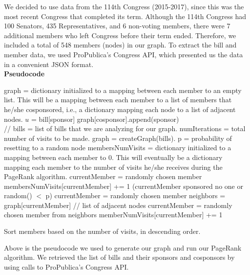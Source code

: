 \documentclass[11pt]{article}
\begin{document}
We decided to use data from the 114th Congress (2015-2017), since this was the most recent Congress that completed its term. Although the 114th Congress had 100 Senators, 435 Representatives, and 6 non-voting members, there were 7 additional members who left Congress before their term ended. Therefore, we included a total of 548 members (nodes) in our graph. To extract the bill and member data, we used ProPublica's Congress API, which presented us the data in a convenient JSON format. \\





\textbf{Pseudocode}

\begin{algorithmic}[1]
\State graph = dictionary initialized to a mapping between each member to an empty list. This will be a mapping between each member to a list of members that he/she cosponsored, i.e., a dictionary mapping each node to a list of adjacent nodes. 
	\State $u$ = bill[sponsor]
		\State graph[cosponsor].append(sponsor)
	\EndFor 
\EndFor
\EndProcedure\\


 // bills = list of bills that we are analyzing for our graph. numIterations = total number of visits to be made. 
\State graph = createGraph(bills). p = probability of resetting to a random node
\State membersNumVisits = dictionary initialized to a mapping between each member to 0. This will eventually be a dictionary mapping each member to the number of visits he/she receives during the PageRank algorithm. 
\State currentMember = randomly chosen member
\State membersNumVisits[currentMember] += 1
	\If (currentMember sponsored no one or random() $<$ p)
		\State currentMember = randomly chosen member
	\Else
		\State neighbors = graph[currentMember] // list of adjacent nodes
		\State currentMember = randomly chosen member from neighbors
	\EndIf
	\State memberNumVisits[currentMember] += 1

\EndFor
\State Sort members based on the number of visits, in descending order. 
\EndProcedure
\end{algorithmic}

Above is the pseudocode we used to generate our graph and run our PageRank algorithm. We retrieved the list of bills and their sponsors and cosponsors by using calls to ProPublica's Congress API. 
\end{document}
